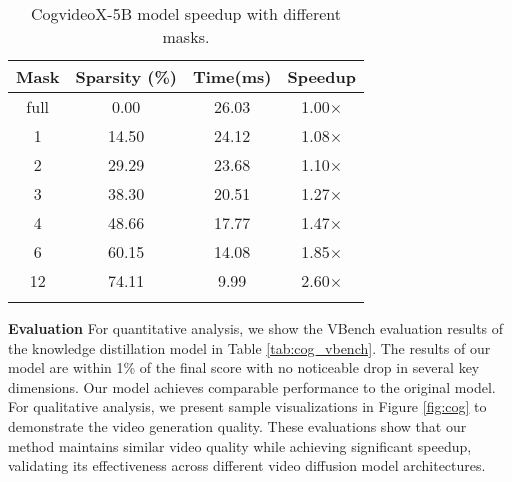 \begin{table*}[h]
\small \centering
\caption{CogvideoX-5B model speedup with different masks.}
\begin{tabular}{cccc}
\toprule
\textbf{Mask} & \textbf{Sparsity (\%)} & \textbf{Time(ms)} & \textbf{Speedup} \\
\midrule 
full & 0.00 & 26.03 & 1.00$\times$ \\
1 & 14.50 & 24.12 & 1.08$\times$ \\
2 & 29.29 & 23.68 & 1.10$\times$ \\
3 & 38.30 & 20.51 & 1.27$\times$ \\
4 & 48.66 & 17.77 & 1.47$\times$ \\
6 & 60.15 & 14.08 & 1.85$\times$ \\
12 & 74.11 & 9.99 & 2.60$\times$ \\
\bottomrule
\vspace{-2mm}
\label{tab:cog_kernel}
\end{tabular}
\end{table*}

\textbf{Evaluation} For quantitative analysis, we show the VBench evaluation results of the knowledge distillation model in Table \ref{tab:cog_vbench}. The results of our model are within 1\% of the final score with no noticeable drop in several key dimensions. Our model achieves comparable performance to the original model. For qualitative analysis, we present sample visualizations in Figure \ref{fig:cog} to demonstrate the video generation quality. These evaluations show that our method maintains similar video quality while achieving significant speedup, validating its effectiveness across different video diffusion model architectures.

